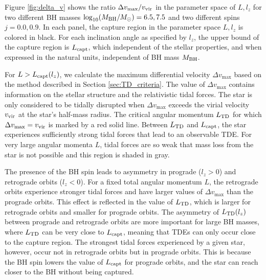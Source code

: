 \documentclass[useAMS,usenatbib]{mn2e}
\def\msun{M_{\rm \odot}}
\def\mBH{M_{\rm BH}}
\def\Lcapt{L_{\rm capt}}
\def\LTD{L_{\rm TD}}
\def\Gyr{{\rm Gyr}}
\begin{document}
Figure \ref{fig:delta_v} shows the ratio $\Delta v_{\max}/v_{\rm vir}$ in the parameter space of $L,l_z$ for two different BH masses $\log_{10}(\mBH/\msun)=6.5,7.5$ and two different spins $j=0.0,0.9$.
In each panel, the capture region in the parameter space $L,l_z$ is colored in black.
For each inclination angle as specified by $l_z$, the upper bound of the capture region is $\Lcapt$, which independent of the stellar properties, and when expressed in the natural units, independent of BH mass $\mBH$.


For $L > L_{\rm capt}(l_z)$, we calculate the maximum differential velocity $\Delta v_{\max}$ based on the method described in Section \ref{sec:TD_criteria}. The value of $\Delta v_{\max}$ contains information on the stellar structure and the relativistic tidal forces.
The star is only considered to be tidally disrupted when $\Delta v_{\max}$ exceeds the virial velocity $v_{\rm vir}$ at the star's half-mass radius.
The critical angular momentum $\LTD$ for which $\Delta v_{\max}=v_{\rm vir}$ is marked by a red solid line.
Between $\LTD$ and $\Lcapt$, the star experiences sufficiently strong tidal forces that lead to an observable TDE. For very large angular momenta $L$, tidal forces are so weak that mass loss from the star is not possible and this region is shaded in gray.

The presence of the BH spin leads to asymmetry in prograde ($l_z>0$) and retrograde orbits ($l_z<0$).
For a fixed total angular momentum $L$, the retrograde orbits experience stronger tidal forces and have larger values of $\Delta v_{\max}$ than the prograde orbits. This effect is reflected in the value of $\LTD$, which is larger for retrograde orbits and smaller for prograde orbits.
The asymmetry of $\LTD(l_z)$ between prograde and retrograde orbits are more important for large BH masses, where $\LTD$ can be very close to $\Lcapt$, meaning that TDEs can only occur close to the capture region.
The strongest tidal forces experienced by a given star, however, occur not in retrograde orbits but in prograde orbits.
This is because the BH spin lowers the value of $\Lcapt$ for prograde orbits, and the star can reach closer to the BH without being captured.
\end{document}

